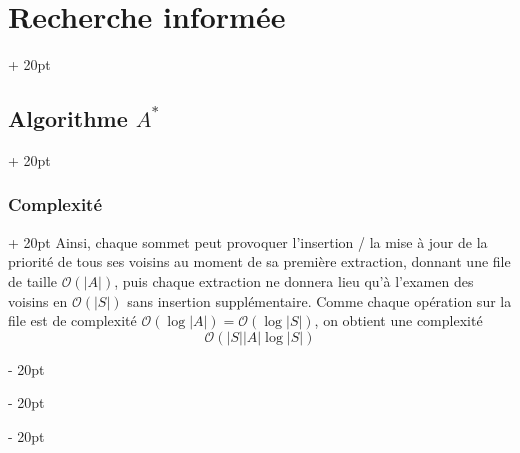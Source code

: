 \documentclass[a4paper, 12pt, twoside]{article}
\newcommand{\abs}[1]{\left\lvert #1 \right\rvert}
\newcommand{\ind}[1][20pt]{\advance\leftskip + #1}
\newcommand{\deind}[1][20pt]{\advance\leftskip - #1}
\newenvironment{indt}[2][20pt]{#2 \par \ind[#1]}{\par \deind} %
\begin{document}
\begin{indt}{\section{Recherche informée}}
\begin{indt}{\subsection{Algorithme $A^*$}}
\begin{indt}{\subsubsection{Complexité}}
                Ainsi, chaque sommet peut provoquer l'insertion / la mise à jour de la priorité de tous ses voisins au moment de sa première extraction, donnant une file de taille $\mathcal O(\abs A)$, puis chaque extraction ne donnera lieu qu'à l'examen des voisins en $\mathcal O(\abs S)$ sans insertion supplémentaire. Comme chaque opération sur la file est de complexité $\mathcal O(\log \abs A) = \mathcal O(\log\abs S)$, on obtient une complexité
                \[
                    \mathcal O(\abs S \abs A \log \abs S)
                \]
            \end{indt}
        \end{indt}
    \end{indt}
    
\end{document}

